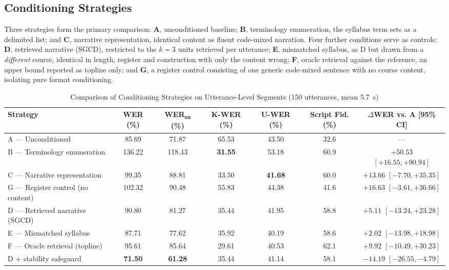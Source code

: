 \documentclass[conference]{IEEEtran}
\begin{document}
\subsection{Conditioning Strategies}

Three strategies form the primary comparison: \textbf{A}, unconditioned baseline;
\textbf{B}, terminology enumeration, the syllabus term sets as a delimited list;
and \textbf{C}, narrative representation, identical content as fluent code-mixed
narration. Four further conditions serve as controls: \textbf{D}, retrieved
narrative (SGCD), restricted to the $k=3$ units retrieved per utterance;
\textbf{E}, mismatched syllabus, as D but drawn from a \textit{different} course,
identical in length, register and construction with only the content wrong;
\textbf{F}, oracle retrieval against the reference, an upper bound reported as
topline only; and \textbf{G}, a register control consisting of one generic
code-mixed sentence with no course content, isolating pure format conditioning.

\begin{table}[htbp]
\caption{Comparison of Conditioning Strategies on Utterance-Level Segments (150 utterances, mean 5.7~s)}
\label{tab:main}
\centering
\begin{tabular}{|l|c|c|c|c|c|c|}
\hline
\textbf{Strategy} & \textbf{WER (\%)} & \textbf{WER\textsubscript{sa} (\%)} &
\textbf{K-WER (\%)} & \textbf{U-WER (\%)} & \textbf{Script Fid. (\%)} &
\textbf{$\Delta$WER vs. A [95\% CI]} \\
\hline
A --- Unconditioned            & 85.69  & 71.87  & 65.53 & 43.50 & 32.6 & --- \\
B --- Terminology enumeration  & 136.22 & 118.43 & \textbf{31.55} & 53.18 & 60.9 & $+50.53$ $[+16.55, +90.94]$ \\
C --- Narrative representation & 99.35  & 88.81  & 33.50 & \textbf{41.68} & 60.0 & $+13.66$ $[-7.70, +35.35]$ \\
\hline
G --- Register control (no content) & 102.32 & 90.48 & 55.83 & 44.38 & 41.6 & $+16.63$ $[-3.61, +36.66]$ \\
D --- Retrieved narrative (SGCD)    & 90.80  & 81.27 & 35.44 & 41.95 & 58.8 & $+5.11$ $[-13.24, +23.28]$ \\
E --- Mismatched syllabus           & 87.71  & 77.62 & 35.92 & 40.19 & 58.6 & $+2.02$ $[-13.98, +18.98]$ \\
F --- Oracle retrieval (topline)    & 95.61  & 85.64 & 29.61 & 40.53 & 62.1 & $+9.92$ $[-10.49, +30.23]$ \\
D + stability safeguard             & \textbf{71.50} & \textbf{61.28} & 35.44 & 41.14 & 58.1 & $\mathbf{-14.19}$ $[-26.55, -4.79]$ \\
\hline
\end{tabular}
\end{table}
\end{document}
